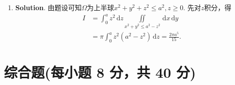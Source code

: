 \documentclass[../Main.tex]{subfiles}
\begin{document}
\begin{enumerate}
    \item \textbf{Solution}. 由题设可知$\Omega$为上半球$x^{2}+y^{2}+z^{2}\leq a^{2}
              ,z\geq0$. 先对$z$积分，得
          \[
              \begin{aligned}
                  I & =\int_{0}^{a}z^{2}\,\mathrm{d}z \iint\limits_{x^{2}+y^{2}\leq a^{2}-z^{2}}\,\mathrm{d}x\,\mathrm{d}y \\
                    & =\pi\int_{0}^{a}z^{2}(a^{2}-z^{2})\,\mathrm{d}z =\frac{2\pi a^{5}}{15}.
              \end{aligned}
          \]
\end{enumerate}

\section{综合题(每小题 8 分，共 40 分)}
\end{document}
